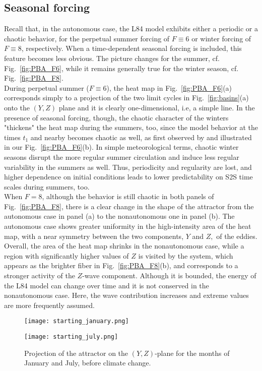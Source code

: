\documentclass[%
 aip, cha,
 amsmath,amssymb,
 reprint,%
author-year,%
]{revtex4-1}
\newcommand{\0}{\mathbf 0}
\begin{document}
\subsection{Seasonal forcing}
\label{sec:seasonal}
Recall that, in the autonomous case, the L84 model exhibits either a periodic or a chaotic behavior, for the perpetual summer forcing of $F \equiv 6$ or winter forcing of $F \equiv 8$, respectively. When a time-dependent seasonal forcing is included,  this feature becomes less obvious. The picture changes for the summer, cf. Fig.~\ref{fig:PBA_F6}, while it remains generally true for the winter season, cf. Fig.~\ref{fig:PBA_F8}.\\
During perpetual summer ($F \equiv 6$), the  heat map in Fig.~\ref{fig:PBA_F6}(a) corresponds simply to a projection of the two limit cycles in Fig.~\ref{fig:basins}(a) onto the $(Y,Z)$ plane and it is clearly one-dimensional, i.e, a simple line. In the presence of seasonal forcing, though, the chaotic character of the winters "thickens" the heat map during the summers, too, since the model behavior at the times $t_1$ and nearby becomes chaotic as well, as first observed by \cite{lorenz90} and illustrated in our Fig.~\ref{fig:PBA_F6}(b). In simple meteorological terms, chaotic winter seasons disrupt the more regular summer circulation and induce less regular variability in the summers as well. Thus, periodicity and regularity are lost, and higher dependence on initial conditions leads to lower predictability on S2S time scales during summers, too. \\
When $F=8$, although the behavior is still chaotic in both panels of Fig.~\ref{fig:PBA_F8}, there is a clear change in the shape of the attractor from the autonomous case in panel (a) to the nonautonomous one in panel (b). The autonomous case shows greater uniformity in the high-intensity area of the heat map, with a near symmetry between the two components, $Y$ and $Z,$ of the eddies. Overall, the area of the heat map shrinks in the nonautonomous case, while a region with significantly higher values of $Z$ is visited by the system, which appears as the brighter fiber in Fig.~\ref{fig:PBA_F8}(b), and corresponds to a stronger activity of the $Z$-wave component. Although it is bounded, the energy of the L84 model can change over time and it is not conserved in the nonautonomous case. Here, the wave contribution increases and extreme values are more frequently assumed.

\begin{figure*}
  \begin{minipage}{0.45\textwidth}
    \centering
    \texttt{[image: starting\_january.png]}
  \end{minipage}%
  \begin{minipage}{0.45\textwidth}
    \centering
    \texttt{[image: starting\_july.png]}
    
  \end{minipage}
\caption{Projection of the attractor on the $(Y,Z)$-plane for the months of January and July,
 		before climate change. }
  \label{fig:Jan+July} 
\end{figure*}
\end{document}
